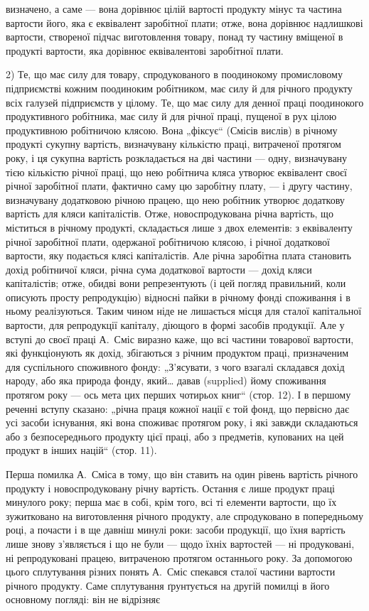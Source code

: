 \parcont{}  %
визначено, а саме — вона дорівнює цілій вартості продукту мінус та частина вартости його, яка є
еквівалент заробітної плати; отже, вона дорівнює надлишкові вартости, створеної підчас виготовлення
товару, понад ту частину вміщеної в продукті вартости, яка дорівнює еквівалентові заробітної плати.

2) Те, що має силу для товару, спродукованого в поодинокому промисловому підприємстві кожним
поодиноким робітником, має силу й для річного продукту всіх галузей підприємств у цілому. Те, що має
силу для денної праці поодинокого продуктивного робітника, має силу й для річної праці, пущеної в
рух цілою продуктивною робітничою клясою. Вона „фіксує“ (Смісів вислів) в річному продукті сукупну
вартість, визначувану кількістю праці, витраченої протягом року, і ця сукупна вартість розкладається
на дві частини — одну, визначувану тією кількістю річної праці, що нею робітнича кляса утворює
еквівалент своєї річної заробітної плати, фактично саму цю заробітну плату, — і другу частину,
визначувану додатковою річною працею, що нею робітник утворює додаткову вартість для кляси
капіталістів. Отже, новоспродукована річна вартість, що міститься в річному продукті, складається
лише з двох елементів: з еквіваленту річної заробітної плати, одержаної робітничою клясою, і
річної додаткової вартости, яку подається клясі капіталістів. Але річна заробітна плата становить
дохід робітничої кляси, річна сума додаткової вартости — дохід кляси капіталістів; отже, обидві вони
репрезентують (і цей погляд правильний, коли описують просту репродукцію) відносні пайки в річному
фонді споживання і в ньому реалізуються. Таким чином ніде не лишається місця для сталої капітальної
вартости, для репродукції капіталу, діющого в формі засобів продукції. Але у вступі до своєї праці
А.~Сміс виразно каже, що всі частини товарової вартости, які функціонують як дохід, збігаються з
річним продуктом праці, призначеним для суспільного споживного фонду: „З’ясувати, з чого взагалі
складався дохід народу, або яка природа фонду, який\dots{} давав (supplied) йому споживання протягом
року — ось мета цих перших чотирьох книг“ (стор. 12). І в першому реченні вступу сказано: „річна
праця кожної нації є той фонд, що первісно дає усі засоби існування, які вона споживає протягом
року, і які завжди складаються або з безпосереднього продукту цієї праці, або з предметів, купованих
на цей продукт в інших націй“ (стор. 11).

Перша помилка А.~Сміса в тому, що він ставить на один рівень вартість річного продукту і
новоспродуковану річну вартість. Остання є лише продукт праці минулого року; перша має в собі, крім
того, всі ті елементи вартости, що їх зужитковано на виготовлення річного продукту, але спродуковано
в попередньому році, а почасти і в ще давніш минулі роки: засоби продукції, що їхня вартість лише
знову з’являється і що не були — щодо їхніх вартостей — ні продуковані, ні репродуковані працею,
витраченою протягом останнього року. За допомогою цього сплутування різних понять А.~Сміс
спекався сталої частини вартости річного продукту. Саме сплутування ґрунтується на другій помилці в
його основному погляді: він не відрізняє
\parbreak{}  %
